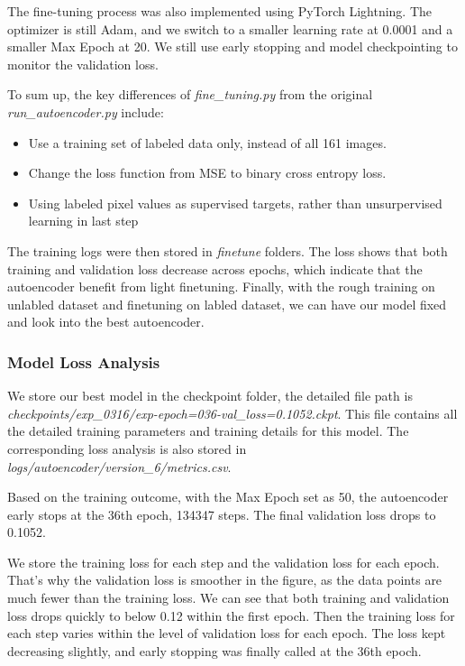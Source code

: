 \documentclass[10pt,letterpaper]{article}
\begin{document}
The fine-tuning process was also implemented using PyTorch Lightning. The optimizer is still Adam, and we switch to a smaller learning rate at 0.0001 and a smaller Max Epoch at 20. We still use early stopping and model checkpointing to monitor the validation loss.

To sum up, the key differences of \textit{fine\_tuning.py} from the original \textit{run\_autoencoder.py} include:

\begin{itemize}
\item  Use a training set of labeled data only, instead of all 161 images.
\item Change the loss function from MSE to binary cross entropy loss.
\item Using labeled pixel values as supervised targets, rather than unsurpervised learning in last step
\end{itemize}


The training logs were then stored in \textit{finetune} folders. The loss shows that both training and validation loss decrease across epochs, which indicate that the autoencoder benefit from light finetuning. Finally, with the rough training on unlabled dataset and finetuning on labled dataset, we can have our model fixed and look into the best autoencoder.



\subsubsection{Model Loss Analysis}



We store our best model in the checkpoint folder, the detailed file path is \textit{checkpoints/exp\_0316/exp-epoch=036-val\_loss=0.1052.ckpt}. This file contains all the detailed training parameters and training details for this model. The corresponding loss analysis is also stored in \textit{logs/autoencoder/version\_6/metrics.csv}. 

Based on the training outcome, with the Max Epoch set as 50, the autoencoder early stops at the 36th epoch, 134347 steps. The final validation loss drops to 0.1052. 

We store the training loss for each step and the validation loss for each epoch. That's why the validation loss is smoother in the figure, as the data points are much fewer than the training loss. We can see that both training and validation loss drops quickly to below 0.12 within the first epoch. Then the training loss for each step varies within the level of validation loss for each epoch. The loss kept decreasing slightly, and early stopping was finally called at the 36th epoch.
\end{document}
